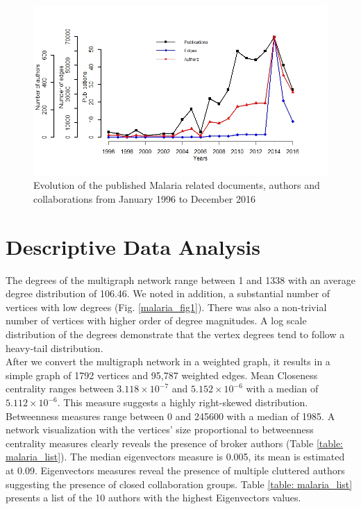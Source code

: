 \begin{figure}[!ht]
\centering
\includegraphics[scale=0.65]{Chapters/malaria/pubDist}
\caption{Evolution of the published Malaria related documents, authors and collaborations from January 1996 to December 2016}
\label{fig: malaria_pubDist}
\end{figure}

\section{Descriptive Data Analysis}
\label{sec:malaria_descstat}
The degrees of the multigraph network range between 1 and 1338 with an average degree distribution of 106.46. We noted in addition, a substantial number of vertices with low degrees (Fig. \ref{malaria_fig1}). There was also a non-trivial number of vertices with higher order of degree magnitudes. A log scale distribution of the degrees demonstrate that the vertex degrees tend to follow a heavy-tail distribution.\\
After we convert the multigraph network in a weighted graph, it results in a simple graph of 1792 vertices and 95,787 weighted edges. Mean Closeness centrality ranges between $3.118\times 10^{-7}$ and $5.152\times 10^{-6}$ with a median of $5.112\times 10^{-6}$. This measure  suggests a highly right-skewed distribution. Betweenness measures range between 0 and 245600 with a median of 1985. A network visualization with the vertices' size proportional to betweenness centrality measures clearly reveals the presence of broker authors (Table \ref{table: malaria_list}). The median eigenvectors measure is 0.005, its  mean is estimated at 0.09. Eigenvectors measures reveal the presence of multiple cluttered authors suggesting the presence of closed collaboration groups. Table \ref{table: malaria_list} presents a list of the 10 authors with the highest Eigenvectors values.

